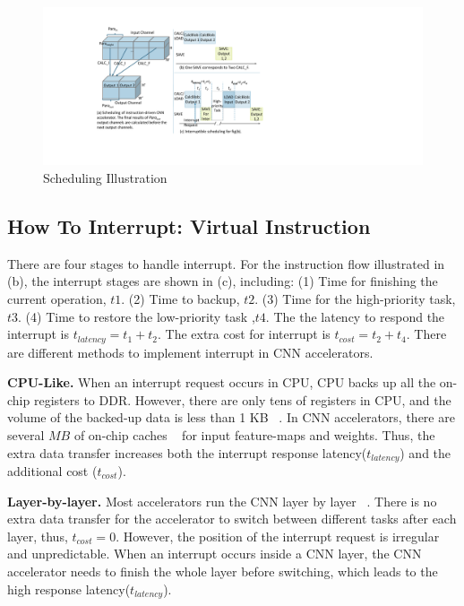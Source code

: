 \begin{figure}[t]
    \centering
	\includegraphics[width=1.04\linewidth]{fig/singlesave.pdf} 	
    \caption{
		Scheduling Illustration
    }
	\label{fig:singlesave}
\end{figure}

\subsection{How To Interrupt: Virtual Instruction}
\label{sec:howinter}

There are four stages to handle interrupt. For the instruction flow illustrated in (b), the interrupt stages are shown in (c), including: (1) Time for finishing the current operation, $t1$. (2) Time to backup, $t2$. (3) Time for the high-priority task, $t3$. (4) Time to restore the low-priority task ,$t4$. The the latency to respond the interrupt is $t_{latency} = t_1+t_2$. The extra cost for interrupt is $t_{cost}=t_2+t_4$. 
There are different methods to implement interrupt in CNN accelerators.

\textbf{CPU-Like.}
When an interrupt request occurs in CPU, CPU backs up all the on-chip registers to DDR. However, there are only tens of registers in CPU, and the volume of the backed-up data is less than 1 KB  ~\cite{furber2000arm}. In CNN accelerators, there are several $MB$ of on-chip caches  ~\cite{qiu2016going, guo2017angel} for input feature-maps and weights. 
Thus, the extra data transfer increases both the interrupt response latency($t_{latency}$) and the additional cost ($t_{cost}$).

\textbf{Layer-by-layer.}
Most accelerators run the CNN layer by layer  ~\cite{qiu2016going,guo2017angel}. 
There is no extra data transfer for the accelerator to switch between different tasks after each layer, thus, $t_{cost}=0$. 
However, the position of the interrupt request is irregular and unpredictable. When an interrupt occurs inside a CNN layer, the CNN accelerator needs to finish the whole layer before switching, which leads to the high response latency($t_{latency}$).

